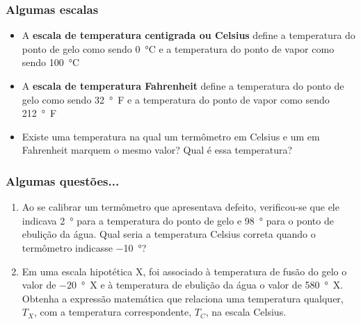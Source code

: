 %
\begin{frame}
    \frametitle{Algumas escalas}
    \begin{itemize}
        \item A \textbf{escala de temperatura centigrada ou Celsius} define a
            temperatura do ponto de gelo como sendo \SI{0}{\celsius} e a
            temperatura do ponto de vapor como sendo \SI{100}{\celsius}
        \item A \textbf{escala de temperatura Fahrenheit} define a temperatura
            do ponto de gelo como sendo \SI{32}{\degree F} e a temperatura do
            ponto de vapor como sendo \SI{212}{\degree F}
        \item Existe uma temperatura na qual um termômetro em Celsius e um em
            Fahrenheit marquem o mesmo valor? Qual é essa temperatura?
    \end{itemize}
\end{frame}

\begin{frame}

    \frametitle{Algumas questões...}
    \begin{enumerate}
        \item Ao se calibrar um termômetro que apresentava defeito,
            verificou-se que ele indicava \SI{2}{\degree} para a temperatura do
            ponto de gelo e \SI{98}{\degree} para o ponto de ebulição da água.
            Qual seria a temperatura Celsius correta quando o termômetro
            indicasse \SI{-10}{\degree}? 

        \item Em uma escala hipotética X, foi associado à temperatura de fusão
            do gelo o valor de \SI{-20}{\degree X} e à temperatura de ebulição
            da água o valor de \SI{580}{\degree X}. Obtenha a expressão
            matemática que relaciona uma temperatura qualquer, \(T_X\), com a
            temperatura correspondente, \(T_C\), na escala Celsius.
    \end{enumerate}
\end{frame}

